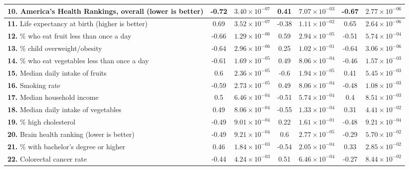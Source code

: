 \documentclass[10pt]{article}
\begin{document}
\begin{table*}
\begin{longtable}{|l|c|c|c|c|c|c|}
 \textbf{10.} America's Health Rankings, overall \cite{america} (lower is better) & -0.72 & $3.40\times 10^{-07}$ & 0.41 & $7.07\times 10^{-03}$ & -0.67 & $2.77\times 10^{-06}$ \\\hline
 \textbf{11.} Life expectancy at birth \cite{kff} (higher is better) & 0.69 & $3.52\times 10^{-07}$ & -0.38 & $1.11\times 10^{-02}$ & 0.65 & $2.64\times 10^{-06}$ \\\hline
 \textbf{12.} \% who eat fruit less than once a day \cite{produce} & -0.66 & $1.29\times 10^{-06}$ & 0.59 & $2.94\times 10^{-05}$ & -0.51 & $5.74\times 10^{-04}$ \\\hline
 \textbf{13.} \% child overweight/obesity \cite{kff} & -0.64 & $2.96\times 10^{-06}$ & 0.25 & $1.02\times 10^{-01}$ & -0.64 & $3.06\times 10^{-06}$ \\\hline
 \textbf{14.} \% who eat vegetables less than once a day \cite{produce} & -0.61 & $1.69\times 10^{-05}$ & 0.49 & $8.06\times 10^{-04}$ & -0.46 & $1.57\times 10^{-03}$ \\\hline
 \textbf{15.} Median daily intake of fruits \cite{produce} & 0.6 & $2.36\times 10^{-05}$ & -0.6 & $1.94\times 10^{-05}$ & 0.41 & $5.45\times 10^{-03}$ \\\hline
 \textbf{16.} Smoking rate \cite{kff} & -0.59 & $2.73\times 10^{-05}$ & 0.49 & $8.06\times 10^{-04}$ & -0.48 & $1.08\times 10^{-03}$ \\\hline
 \textbf{17.} Median household income \cite{kff} & 0.5 & $6.46\times 10^{-04}$ & -0.51 & $5.74\times 10^{-04}$ & 0.4 & $8.51\times 10^{-03}$ \\\hline
 \textbf{18.} Median daily intake of vegetables \cite{produce} & 0.49 & $8.06\times 10^{-04}$ & -0.55 & $1.33\times 10^{-04}$ & 0.31 & $4.41\times 10^{-02}$ \\\hline
 \textbf{19.} \% high cholesterol \cite{america} & -0.49 & $9.01\times 10^{-04}$ & 0.22 & $1.61\times 10^{-01}$ & -0.48 & $9.21\times 10^{-04}$ \\\hline
 \textbf{20.} Brain health ranking \cite{brain} (lower is better) & -0.49 & $9.21\times 10^{-04}$ & 0.6 & $2.77\times 10^{-05}$ & -0.29 & $5.70\times 10^{-02}$ \\\hline
 \textbf{21.} \% with bachelor's degree or higher \cite{census} & 0.46 & $1.84\times 10^{-03}$ & -0.54 & $2.05\times 10^{-04}$ & 0.33 & $2.85\times 10^{-02}$ \\\hline
 \textbf{22.} Colorectal cancer rate \cite{cdc} & -0.44 & $4.24\times 10^{-03}$ & 0.51 & $6.46\times 10^{-04}$ & -0.27 & $8.44\times 10^{-02}$ \\\hline

\end{longtable}
\end{table*}
\end{document}
